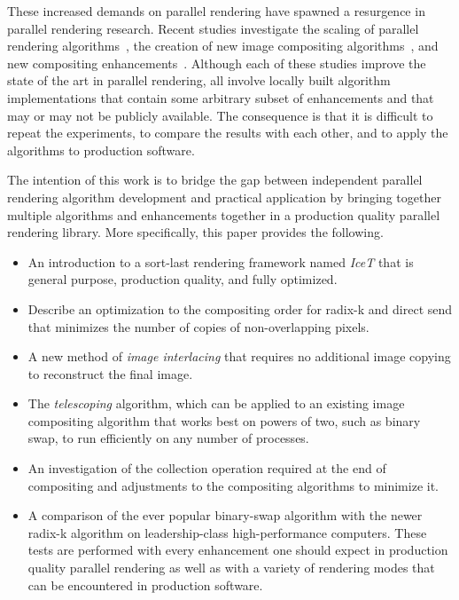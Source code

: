 \documentclass{acm_proc_article-sp}
\newcommand*{\lcite}[1]{~\cite{#1}}
\newcommand*{\keyterm}[1]{\emph{#1}}
\begin{document}
These increased demands on parallel rendering have spawned a resurgence in
parallel rendering research.  Recent studies investigate the scaling of
parallel rendering algorithms\lcite{Peterka2009}, the creation of new image
compositing algorithms\lcite{23Swap,RadixK}, and new compositing
enhancements\lcite{Kendall2010}.  Although each of these studies improve
the state of the art in parallel rendering, all involve locally built
algorithm implementations that contain some arbitrary subset of
enhancements and that may or may not be publicly available.  The
consequence is that it is difficult to repeat the experiments, to compare
the results with each other, and to apply the algorithms to production
software.

The intention of this work is to bridge the gap between independent
parallel rendering algorithm development and practical application by
bringing together multiple algorithms and enhancements together in a
production quality parallel rendering library.  More specifically, this
paper provides the following.

\begin{itemize}
\item An introduction to a sort-last rendering framework named
  \keyterm{IceT} that is general purpose, production quality, and fully
  optimized.
\item Describe an optimization to the compositing order for radix-k and
  direct send that minimizes the number of copies of non-overlapping
  pixels.
\item A new method of \keyterm{image interlacing} that requires no
  additional image copying to reconstruct the final image.
\item The \keyterm{telescoping} algorithm, which can be applied to an
  existing image compositing algorithm that works best on powers of two,
  such as binary swap, to run efficiently on any number of processes.
\item An investigation of the collection operation required at the end of
  compositing and adjustments to the compositing algorithms to minimize
  it.
\item A comparison of the ever popular binary-swap algorithm with the newer
  radix-k algorithm on leadership-class high-performance computers.  These
  tests are performed with every enhancement one should expect in
  production quality parallel rendering as well as with a variety of
  rendering modes that can be encountered in production software.
\end{itemize}
\end{document}
